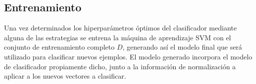 %
%
\subsection{Entrenamiento}
%
Una vez determinados los hiperparámetros óptimos del clasificador
mediante alguna de las estrategias se entrena la máquina de
aprendizaje SVM con el conjunto de entrenamiento completo $D$,
generando así el modelo final que será utilizado para clasificar
nuevos ejemplos.
El modelo generado incorpora el modelo de clasificador propiamente
dicho, junto a la información de normalización a aplicar a los nuevos
vectores a clasificar.
